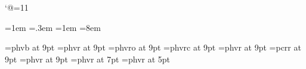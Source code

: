 \catcode`@=11

\newskip\hsparskip	\hsparskip=8pt
\newdimen\hsleftskip	\hsleftskip=30pt
\newdimen\hsrightskip	\hsrightskip=10pt
\newdimen\hscommentskip	\hscommentskip=1em
\newdimen\hswordspace	\hswordspace=.3em
\newdimen\hsspacewidth	\hsspacewidth=1em
\newdimen\hstabwidth	\hstabwidth=8em

\def\everyhs{}
\def\beforehs{\vskip 4pt plus3pt minus1pt}
\def\afterhs{\vskip 4pt plus3pt minus1pt}

\font\hs@keyface=phvb at 9pt
\font\hs@funface=phvr at 9pt
\font\hs@varface=phvro at 9pt
\font\hs@conface=phvrc at 9pt
\font\hs@numface=phvr at 9pt
\font\hs@strface=pcrr at 9pt
\font\hs@symface=phvr at 9pt
\font\hs@ssymface=phvr at 7pt
\font\hs@sssymface=phvr at 5pt

\let\hsfunface\hs@funface

\hyphenchar{}
\hyphenchar{}
\hyphenchar{}
\hyphenchar{}
\hyphenchar{}
\hyphenchar{}
\hyphenchar{}
\hyphenchar{}
\hyphenchar{}


%
%
%
%

%

